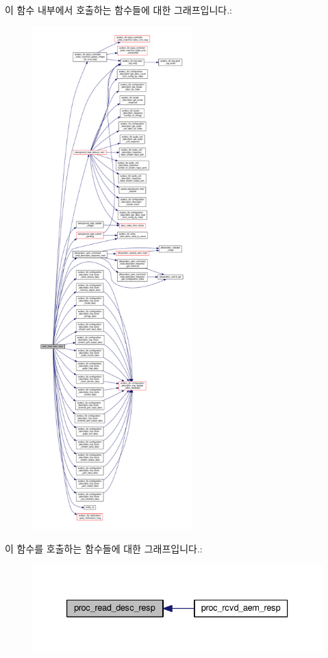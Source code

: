 이 함수 내부에서 호출하는 함수들에 대한 그래프입니다.\+:
\nopagebreak
\begin{figure}[H]
\begin{center}
\leavevmode
\includegraphics[height=550pt]{classavdecc__lib_1_1end__station__imp_aec709f7fbab1e54a17c113219c690f5f_cgraph}
\end{center}
\end{figure}




이 함수를 호출하는 함수들에 대한 그래프입니다.\+:
\nopagebreak
\begin{figure}[H]
\begin{center}
\leavevmode
\includegraphics[width=333pt]{classavdecc__lib_1_1end__station__imp_aec709f7fbab1e54a17c113219c690f5f_icgraph}
\end{center}
\end{figure}


